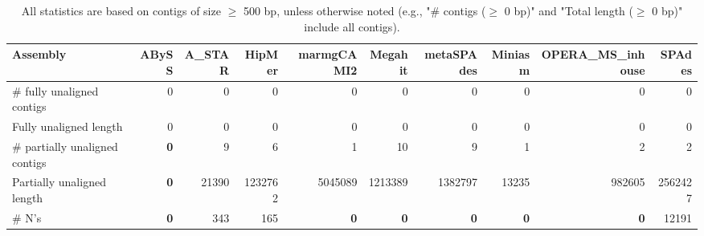 \documentclass[12pt,a4paper]{article}
\begin{document}
\begin{table}[ht]
\begin{center}
\caption{All statistics are based on contigs of size $\geq$ 500 bp, unless otherwise noted (e.g., "\# contigs ($\geq$ 0 bp)" and "Total length ($\geq$ 0 bp)" include all contigs).}
\begin{tabular}{|l*{9}{|r}|}
\hline
Assembly & ABySS & A\_STAR & HipMer & marmgCAMI2 & Megahit & metaSPAdes & Miniasm & OPERA\_MS\_inhouse & SPAdes \\ \hline
\# fully unaligned contigs & 0 & 0 & 0 & 0 & 0 & 0 & 0 & 0 & 0 \\ \hline
Fully unaligned length & 0 & 0 & 0 & 0 & 0 & 0 & 0 & 0 & 0 \\ \hline
\# partially unaligned contigs & {\bf 0} & 9 & 6 & 1 & 10 & 9 & 1 & 2 & 2 \\ \hline
Partially unaligned length & {\bf 0} & 21390 & 1232762 & 5045089 & 1213389 & 1382797 & 13235 & 982605 & 2562427 \\ \hline
\# N's & {\bf 0} & 343 & 165 & {\bf 0} & {\bf 0} & {\bf 0} & {\bf 0} & {\bf 0} & 12191 \\ \hline
\end{tabular}
\end{center}
\end{table}
\end{document}
